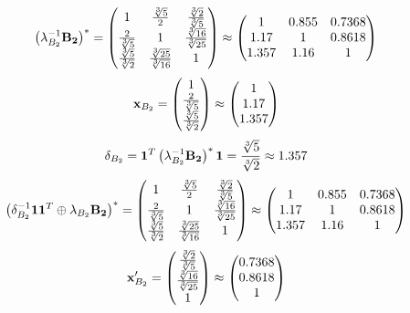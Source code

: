 \documentclass[10pt,a4paper]{article}
\begin{document}
	\[
		\left(\lambda_{B_2}^{-1}\bold{B_2}\right)^* = 
		\begin{pmatrix}
			{1} {} & \frac{\sqrt[3]{5}} {{2}} & \frac{\sqrt[3]{2}} {\sqrt[3]{5}} \\
			\frac{{2}} {\sqrt[3]{5}} & {1} {} & \frac{\sqrt[3]{16}} {\sqrt[3]{25}} \\
			\frac{\sqrt[3]{5}} {\sqrt[3]{2}} & \frac{\sqrt[3]{25}} {\sqrt[3]{16}} & {1} {} \\
		\end{pmatrix}
		\approx
		\begin{pmatrix}
			1        & 0.855    & 0.7368   \\
			1.17     & 1        & 0.8618   \\
			1.357    & 1.16     & 1        \\
		\end{pmatrix}
	\]
	\[
		\bold{x}_{B_2} = 
		\begin{pmatrix}
			{1} {} \\
			\frac{{2}} {\sqrt[3]{5}} \\
			\frac{\sqrt[3]{5}} {\sqrt[3]{2}} \\
		\end{pmatrix}
		\approx
		\begin{pmatrix}
			1        \\
			1.17     \\
			1.357    \\
		\end{pmatrix}
	\]
	\[
		\delta_{B_2} = \bold{1}^T \left(\lambda_{B_2}^{-1}\bold{B_2}\right)^* \bold{1} = \frac{\sqrt[3]{5}} {\sqrt[3]{2}}\approx 1.357
	\]
	\[
		\left(\delta_{B_2}^{-1}\bold{11}^T \oplus \lambda_{B_2}\bold{B_2}\right)^* = 
		\begin{pmatrix}
			{1} {} & \frac{\sqrt[3]{5}} {{2}} & \frac{\sqrt[3]{2}} {\sqrt[3]{5}} \\
			\frac{{2}} {\sqrt[3]{5}} & {1} {} & \frac{\sqrt[3]{16}} {\sqrt[3]{25}} \\
			\frac{\sqrt[3]{5}} {\sqrt[3]{2}} & \frac{\sqrt[3]{25}} {\sqrt[3]{16}} & {1} {} \\
		\end{pmatrix}
		\approx
		\begin{pmatrix}
			1        & 0.855    & 0.7368   \\
			1.17     & 1        & 0.8618   \\
			1.357    & 1.16     & 1        \\
		\end{pmatrix}
	\]
	\[
		\bold{x}'_{B_2} = 
		\begin{pmatrix}
			\frac{\sqrt[3]{2}} {\sqrt[3]{5}} \\
			\frac{\sqrt[3]{16}} {\sqrt[3]{25}} \\
			{1} {} \\
		\end{pmatrix}
		\approx
		\begin{pmatrix}
			0.7368   \\
			0.8618   \\
			1        \\
		\end{pmatrix}
	\]
\end{document}
